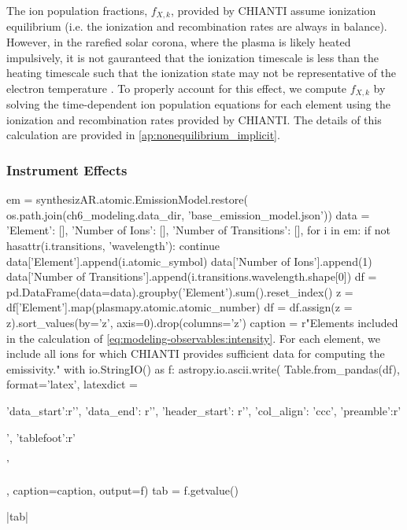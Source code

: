 The ion population fractions, $f_{X,k}$, provided by CHIANTI assume ionization equilibrium (i.e. the ionization and recombination rates are always in balance). However, in the rarefied solar corona, where the plasma is likely heated impulsively, it is not gauranteed that the ionization timescale is less than the heating timescale such that the ionization state may not be representative of the electron temperature \citep{bradshaw_explosive_2006,reale_nonequilibrium_2008,bradshaw_numerical_2009}. To properly account for this effect, we compute $f_{X,k}$ by solving the time-dependent ion population equations for each element using the ionization and recombination rates provided by CHIANTI. The details of this calculation are provided in \autoref{ap:nonequilibrium_implicit}.

\subsubsection{Instrument Effects}\label{sec:modeling-observables:instrument}

\begin{pycode}
em = synthesizAR.atomic.EmissionModel.restore(
    os.path.join(ch6_modeling.data_dir, 'base_emission_model.json'))
data = {'Element': [], 'Number of Ions': [], 'Number of Transitions': [],}
for i in em:
    if not hasattr(i.transitions, 'wavelength'):
        continue
    data['Element'].append(i.atomic_symbol)
    data['Number of Ions'].append(1)
    data['Number of Transitions'].append(i.transitions.wavelength.shape[0])
df = pd.DataFrame(data=data).groupby('Element').sum().reset_index()
z = df['Element'].map(plasmapy.atomic.atomic_number)
df = df.assign(z = z).sort_values(by='z', axis=0).drop(columns='z')
caption = r"Elements included in the calculation of \autoref{eq:modeling-observables:intensity}. For each element, we include all ions for which CHIANTI provides sufficient data for computing the emissivity.\label{tab:modeling-observables:elements}"
with io.StringIO() as f:
    astropy.io.ascii.write(
        Table.from_pandas(df),
        format='latex',
        latexdict = {'data_start':r'\midrule', 'data_end': r'\bottomrule',
                     'header_start': r'\toprule', 'col_align': 'ccc',
                     'preamble':r'\begin{center}', 'tablefoot':r'\end{center}'},
        caption=caption,
        output=f)
    tab = f.getvalue()
\end{pycode}
|tab|

